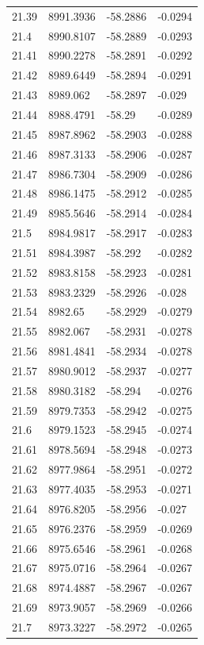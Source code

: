 \begin{table}[H]
\begin{tabular}{llll}
21.39 & 8991.3936 & -58.2886 & -0.0294 \\
21.4 & 8990.8107 & -58.2889 & -0.0293 \\
21.41 & 8990.2278 & -58.2891 & -0.0292 \\
21.42 & 8989.6449 & -58.2894 & -0.0291 \\
21.43 & 8989.062 & -58.2897 & -0.029 \\
21.44 & 8988.4791 & -58.29 & -0.0289 \\
21.45 & 8987.8962 & -58.2903 & -0.0288 \\
21.46 & 8987.3133 & -58.2906 & -0.0287 \\
21.47 & 8986.7304 & -58.2909 & -0.0286 \\
21.48 & 8986.1475 & -58.2912 & -0.0285 \\
21.49 & 8985.5646 & -58.2914 & -0.0284 \\
21.5 & 8984.9817 & -58.2917 & -0.0283 \\
21.51 & 8984.3987 & -58.292 & -0.0282 \\
21.52 & 8983.8158 & -58.2923 & -0.0281 \\
21.53 & 8983.2329 & -58.2926 & -0.028 \\
21.54 & 8982.65 & -58.2929 & -0.0279 \\
21.55 & 8982.067 & -58.2931 & -0.0278 \\
21.56 & 8981.4841 & -58.2934 & -0.0278 \\
21.57 & 8980.9012 & -58.2937 & -0.0277 \\
21.58 & 8980.3182 & -58.294 & -0.0276 \\
21.59 & 8979.7353 & -58.2942 & -0.0275 \\
21.6 & 8979.1523 & -58.2945 & -0.0274 \\
21.61 & 8978.5694 & -58.2948 & -0.0273 \\
21.62 & 8977.9864 & -58.2951 & -0.0272 \\
21.63 & 8977.4035 & -58.2953 & -0.0271 \\
21.64 & 8976.8205 & -58.2956 & -0.027 \\
21.65 & 8976.2376 & -58.2959 & -0.0269 \\
21.66 & 8975.6546 & -58.2961 & -0.0268 \\
21.67 & 8975.0716 & -58.2964 & -0.0267 \\
21.68 & 8974.4887 & -58.2967 & -0.0267 \\
21.69 & 8973.9057 & -58.2969 & -0.0266 \\
21.7 & 8973.3227 & -58.2972 & -0.0265 \\

\end{tabular}
\end{table}
